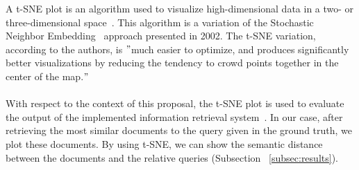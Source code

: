 A t-SNE plot is an algorithm used to visualize high-dimensional data in a two- or three-dimensional space~\cite{maaten_visualizing_2008}.
This algorithm is a variation of the Stochastic Neighbor Embedding~\cite{hinton_stochastic_2002} approach presented in 2002.
The t-SNE variation, according to the authors, is \("\)much easier to optimize, and produces significantly better visualizations by reducing the tendency to crowd points together in the center of the map.\("\) \\ \\
With respect to the context of this proposal, the t-SNE plot is used to evaluate the output of the implemented information retrieval system~\cite{peltonen_information_2015}.
In our case, after retrieving the most similar documents to the query given in the ground truth, we plot these documents.
By using t-SNE, we can show the semantic distance between the documents and the relative queries (Subsection ~\ref{subsec:results}).